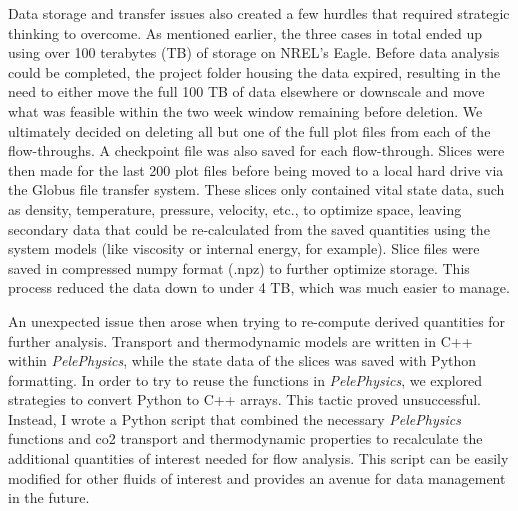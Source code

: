 Data storage and transfer issues also created a few hurdles that required strategic thinking to overcome. As mentioned earlier, the three cases in total ended up using over 100 terabytes (TB) of storage on NREL's Eagle. Before data analysis could be completed, the project folder housing the data expired, resulting in the need to either move the full 100 TB of data elsewhere or downscale and move what was feasible within the two week window remaining before deletion. We ultimately decided on deleting all but one of the full plot files from each of the flow-throughs. A checkpoint file was also saved for each flow-through. Slices were then made for the last 200 plot files before being moved to a local hard drive via the Globus file transfer system. These slices only contained vital state data, such as density, temperature, pressure, velocity, etc., to optimize space, leaving secondary data that could be re-calculated from the saved quantities using the system models (like viscosity or internal energy, for example). Slice files were saved in compressed numpy format (.npz) to further optimize storage. This process reduced the data down to under 4 TB, which was much easier to manage. 

An unexpected issue then arose when trying to re-compute derived quantities for further analysis. Transport and thermodynamic models are written in C++ within \textit{PelePhysics}, while the state data of the slices was saved with Python formatting. In order to try to reuse the functions in \textit{PelePhysics}, we explored  strategies to convert Python to C++ arrays. This tactic proved unsuccessful. Instead, I wrote a Python script that combined the necessary \textit{PelePhysics} functions and \gls{co2} transport and thermodynamic properties to recalculate the additional quantities of interest needed for flow analysis. This script can be easily modified for other fluids of interest and provides an avenue for data management in the future. 


